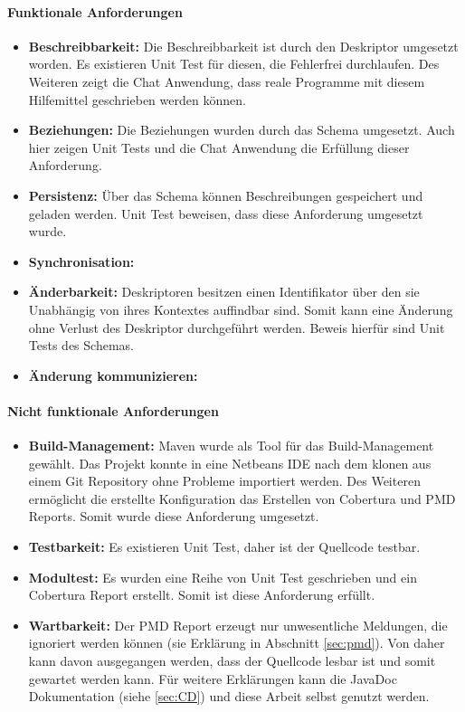 \documentclass[a4paper]{article}
\begin{document}
	\paragraph{Funktionale Anforderungen}
	\begin{itemize}
		\item \textbf{Beschreibbarkeit:} Die Beschreibbarkeit ist durch den
		Deskriptor umgesetzt worden. Es existieren Unit Test
		für diesen, die Fehlerfrei durchlaufen. Des Weiteren zeigt die Chat
		Anwendung, dass reale Programme mit diesem Hilfemittel geschrieben werden
		können.
		\item \textbf{Beziehungen:} Die Beziehungen wurden durch das Schema
		umgesetzt. Auch hier zeigen Unit Tests und die Chat Anwendung die Erfüllung
		dieser Anforderung.
		\item \textbf{Persistenz:} Über das Schema können Beschreibungen gespeichert
		und geladen werden. Unit Test beweisen, dass diese Anforderung umgesetzt
		wurde.
		\item \textbf{Synchronisation:} 
		\item \textbf{Änderbarkeit:} Deskriptoren besitzen einen Identifikator über
		den sie Unabhängig von ihres Kontextes auffindbar sind. Somit kann
		eine Änderung ohne Verlust des Deskriptor durchgeführt werden. Beweis hierfür
		sind Unit Tests des Schemas.
		\item \textbf{Änderung kommunizieren:}
	\end{itemize} 	
	
	\paragraph{Nicht funktionale Anforderungen}
	\begin{itemize}
		\item \textbf{Build-Management:} Maven wurde als Tool für das
		Build-Management gewählt. Das Projekt konnte in eine Netbeans IDE
		nach dem klonen aus einem Git Repository ohne Probleme importiert werden.
		Des Weiteren ermöglicht die erstellte Konfiguration das Erstellen von
		Cobertura und PMD Reports. Somit wurde diese Anforderung umgesetzt.
		\item \textbf{Testbarkeit:} Es existieren Unit Test, daher ist der Quellcode
		testbar.
		\item \textbf{Modultest:} Es wurden eine Reihe von Unit Test geschrieben und
		ein Cobertura Report erstellt. Somit ist diese Anforderung erfüllt.
		\item \textbf{Wartbarkeit:} Der PMD Report erzeugt nur unwesentliche
		Meldungen, die ignoriert werden können (sie Erklärung in Abschnitt
		\ref{sec:pmd}). Von daher kann davon ausgegangen werden, dass der Quellcode
		lesbar ist und somit gewartet werden kann. Für weitere Erklärungen kann
		die JavaDoc Dokumentation (siehe \autoref{sec:CD}) und diese Arbeit selbst
		genutzt werden.
	\end{itemize} 
	
\end{document}
